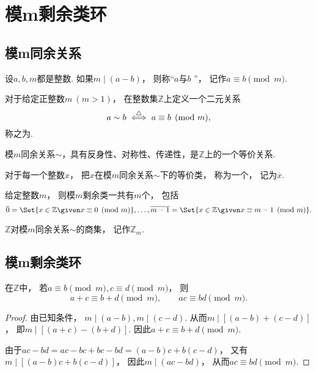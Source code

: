 \section{模m剩余类环}
\subsection{模m同余关系}
\begin{definition}
设\(a,b,m\)都是整数.
如果\(m\mid(a-b)\)，
则称“\(a\)与\(b\) ”，
记作\(a\equiv b\pmod m\).
\end{definition}
\begin{definition}
对于给定正整数\(m\ (m>1)\)，
在整数集\(\mathbb{Z}\)上定义一个二元关系\begin{equation*}
	a \sim b
	\overset{\triangle}{\iff}
	a\equiv b\pmod m,
\end{equation*}
称之为.
\end{definition}
\begin{theorem}
模\(m\)同余关系\(\sim\)，具有反身性、对称性、传递性，是\(\mathbb{Z}\)上的一个等价关系.
\end{theorem}
\begin{definition}
对于每一个整数\(x\)，
把\(x\)在模\(m\)同余关系\(\sim\)下的等价类，
称为一个，
记为\(\overline{x}\).
\end{definition}
\begin{proposition}
给定整数\(m\)，
则模\(m\)剩余类一共有\(m\)个，
包括\begin{equation*}
	\overline{0}
	= \Set{ x\in\mathbb{Z} \given x\equiv0\pmod m },
	\dotsc,
	\overline{m-1}
	= \Set{ x\in\mathbb{Z} \given x\equiv m-1\pmod m }.
\end{equation*}
\end{proposition}
\begin{definition}
\(\mathbb{Z}\)对模\(m\)同余关系\(\sim\)的商集，
记作\(\mathbb{Z}_m\).
\end{definition}

\subsection{模m剩余类环}
\begin{proposition}
在\(\mathbb{Z}\)中，
若\(a\equiv b\pmod m,
c\equiv d\pmod m\)，
则\[
	a+c\equiv b+d\pmod m, \qquad
	ac\equiv bd\pmod m.
\]
\begin{proof}
由已知条件，
\(m\mid(a-b),
m\mid(c-d)\).
从而\(m\mid[(a-b)+(c-d)]\)，
即\(m\mid[(a+c)-(b+d)]\).
因此\(a+c\equiv b+d\pmod m\).

由于\(ac-bd
=ac-bc+bc-bd
=(a-b)c+b(c-d)\)，
又有\(m\mid[(a-b)c+b(c-d)]\)，
因此\(m\mid(ac-bd)\)，
从而\(ac\equiv bd\pmod m\).
\end{proof}
\end{proposition}

